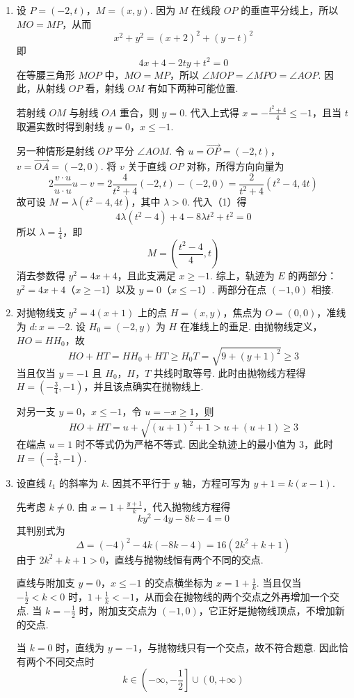 \begin{solution}
\begin{enumerate}
\item 设 \(P=(-2,t)\)，\(M=(x,y)\). 因为 \(M\) 在线段 \(OP\) 的垂直平分线上，所以 \(MO=MP\)，从而
\[
x^2+y^2=(x+2)^2+(y-t)^2
\]
即
\[
4x+4-2ty+t^2=0
\]
在等腰三角形 \(MOP\) 中，\(MO=MP\)，所以 \(\angle MOP=\angle MPO=\angle AOP\). 因此，从射线 \(OP\) 看，射线 \(OM\) 有如下两种可能位置.

若射线 \(OM\) 与射线 \(OA\) 重合，则 \(y=0\). 代入上式得 \(x=-\frac{t^2+4}{4}\leqslant-1\)，且当 \(t\) 取遍实数时得到射线 \(y=0\)，\(x\leqslant-1\).

另一种情形是射线 \(OP\) 平分 \(\angle AOM\). 令 \(u=\overrightarrow{OP}=(-2,t)\)，\(v=\overrightarrow{OA}=(-2,0)\). 将 \(v\) 关于直线 \(OP\) 对称，所得方向向量为
\[
2\frac{v\cdot u}{u\cdot u}u-v
=2\frac{4}{t^2+4}(-2,t)-(-2,0)
=\frac{2}{t^2+4}(t^2-4,4t)
\]
故可设 \(M=\lambda(t^2-4,4t)\)，其中 \(\lambda>0\). 代入（1）得
\[
4\lambda(t^2-4)+4-8\lambda t^2+t^2=0
\]
所以 \(\lambda=\frac14\)，即
\[
M=\left(\frac{t^2-4}{4},t\right)
\]
消去参数得 \(y^2=4x+4\)，且此支满足 \(x\geqslant-1\). 综上，轨迹为 \(E\) 的两部分：\(y^2=4x+4\)（\(x\geqslant-1\)）以及 \(y=0\)（\(x\leqslant-1\)）.
两部分在点 \((-1,0)\) 相接.
\item 对抛物线支 \(y^2=4(x+1)\) 上的点 \(H=(x,y)\)，焦点为 \(O=(0,0)\)，准线为 \(d:x=-2\). 设 \(H_0=(-2,y)\) 为 \(H\) 在准线上的垂足. 由抛物线定义，\(HO=HH_0\)，故
\[
HO+HT=HH_0+HT\geqslant H_0T=\sqrt{9+(y+1)^2}\geqslant3
\]
当且仅当 \(y=-1\) 且 \(H_0\)，\(H\)，\(T\) 共线时取等号. 此时由抛物线方程得 \(H=\left(-\frac34,-1\right)\)，并且该点确实在抛物线上.

对另一支 \(y=0\)，\(x\leqslant-1\)，令 \(u=-x\geqslant1\)，则
\[
HO+HT=u+\sqrt{(u+1)^2+1}>u+(u+1)\geqslant3
\]
在端点 \(u=1\) 时不等式仍为严格不等式. 因此全轨迹上的最小值为 \(3\)，此时 \(H=\left(-\frac34,-1\right)\).
\item 设直线 \(l_1\) 的斜率为 \(k\). 因其不平行于 \(y\) 轴，方程可写为 \(y+1=k(x-1)\).

先考虑 \(k\ne0\). 由 \(x=1+\frac{y+1}{k}\)，代入抛物线方程得
\[
ky^2-4y-8k-4=0
\]
其判别式为
\[
\Delta=(-4)^2-4k(-8k-4)=16(2k^2+k+1)
\]
由于 \(2k^2+k+1>0\)，直线与抛物线恒有两个不同的交点.

直线与附加支 \(y=0\)，\(x\leqslant-1\) 的交点横坐标为 \(x=1+\frac1k\). 当且仅当 \(-\frac12<k<0\) 时，\(1+\frac1k<-1\)，从而会在抛物线的两个交点之外再增加一个交点. 当 \(k=-\frac12\) 时，附加支交点为 \((-1,0)\)，它正好是抛物线顶点，不增加新的交点.

当 \(k=0\) 时，直线为 \(y=-1\)，与抛物线只有一个交点，故不符合题意. 因此恰有两个不同交点时
\[
k\in\left(-\infty,-\frac12\right]\cup(0,+\infty)
\]
\end{enumerate}
\end{solution}
